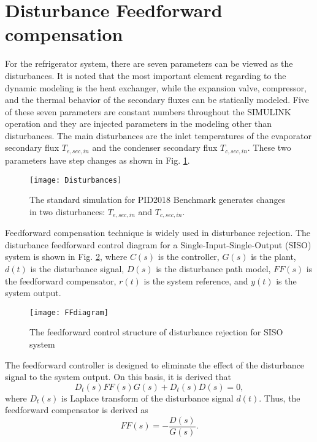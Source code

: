 \documentclass{ifacconf}
\begin{document}
\section{Disturbance Feedforward compensation}
For the refrigerator system, there are seven parameters can be viewed as the disturbances. It is noted that the most important element regarding to the dynamic modeling is the heat exchanger, while the expansion valve, compressor, and the thermal behavior of the secondary fluxes can be statically modeled. Five of these seven parameters are constant numbers throughout the {\rm{SIMULINK}} operation and they are injected parameters in the modeling other than disturbances. The main disturbances are the inlet temperatures of the evaporator secondary flux $T_{e,sec,in}$ and the condenser secondary flux $T_{c,sec,in}$. These two parameters have step changes as shown in Fig. \ref{Disturbances}.

\begin{figure}[htbp]
\begin{center}
\texttt{[image: Disturbances]}    %
\caption{The standard simulation for PID2018 Benchmark generates changes in two
disturbances: $T_{e,sec,in}$ and $T_{c,sec,in}$.}
\label{Disturbances}
\end{center}
\end{figure}

Feedforward compensation technique is widely used in disturbance rejection. The disturbance feedforward control diagram for a Single-Input-Single-Output (SISO) system is shown in Fig. \ref{FFdiagram}, where $C(s)$ is the controller, $G(s)$ is the plant, $d(t)$ is the disturbance signal, $D(s)$ is the disturbance path model, $FF(s)$ is the feedforward compensator, $r(t)$ is the system reference, and $y(t)$ is the system output.

\begin{figure}[htbp]
\begin{center}
\texttt{[image: FFdiagram]}    %
\caption{The feedforward control structure of disturbance rejection for SISO system}
\label{FFdiagram}
\end{center}
\end{figure}

The feedforward controller is designed to eliminate the effect of the disturbance signal to the system output. On this basis, it is derived that
\begin{equation}
D_t(s)FF(s)G(s)+D_t(s)D(s)=0,
\end{equation}
where $D_t(s)$ is Laplace transform of the disturbance signal $d(t)$. Thus, the feedforward compensator is derived as
\begin{equation}   \label{FF}
FF(s)=-\frac{D(s)}{G(s)}.
\end{equation}
\end{document}

